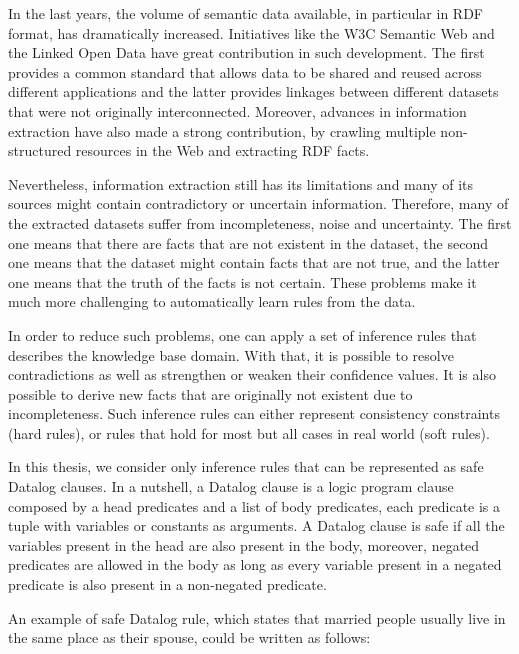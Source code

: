 In the last years, the volume of semantic data available, in particular in RDF format, has dramatically
increased. Initiatives like the W3C Semantic Web and the Linked Open Data  have great contribution in such
development. The first provides a common standard that allows data to be shared and reused across different
applications and the latter provides linkages between different datasets that were not originally interconnected.
Moreover, advances in information extraction have also made a strong contribution, by crawling multiple non-structured
resources in the Web and extracting RDF facts.

Nevertheless, information extraction still has its limitations and many of its sources might contain contradictory
or uncertain information. Therefore, many of the extracted datasets suffer from incompleteness, noise and uncertainty.
The first one means that there are facts that are not existent in the dataset, the second one means that the dataset
might contain facts that are not true, and the latter one means that the truth of the facts is not certain. These
problems make it much more challenging to automatically learn rules from the data.


In order to reduce such problems, one can apply a set of inference rules that describes the knowledge base domain.
With that, it is possible to resolve contradictions as well as strengthen or weaken their confidence values. It is
also possible to derive new facts that are originally not existent due to incompleteness. Such inference rules can
either represent consistency constraints (hard rules), or rules that hold for most but all cases in real world (soft
rules).

In this thesis, we consider only inference rules that can be represented as safe Datalog clauses. In a nutshell,
a Datalog clause is a logic program clause composed by a head predicates and a list of body predicates, each
predicate is a tuple with variables or constants as arguments. A Datalog clause is safe if all the variables present
in the head are also present in the body, moreover, negated predicates are allowed in the body as long as every
variable present in a negated predicate is also present in a non-negated predicate.

An example of safe Datalog rule, which states that married people usually live in the same place as their spouse,
could be written as follows:

